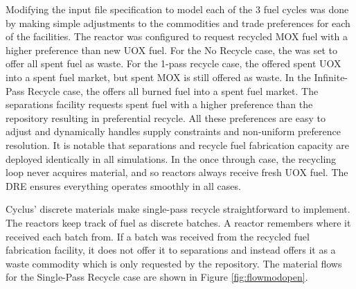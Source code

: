Modifying the input file specification to model each of the 3 fuel cycles was
done by making simple adjustments to the commodities and trade preferences for
each of the facilities.  The reactor was configured to request recycled \gls{MOX}
fuel with a higher preference than new \gls{UOX} fuel. For the No Recycle case,
the  was set to offer all spent fuel as waste.  For the 1-pass
recycle case, the  offered spent \gls{UOX} into a spent fuel market,
but spent \gls{MOX} is still offered as waste.  In the Infinite-Pass Recycle case,
the  offers all burned fuel into a spent fuel market. The
separations facility requests spent fuel with a higher preference than the
repository resulting in preferential recycle.  All these preferences are easy
to adjust and \Cyclus dynamically handles supply constraints and non-uniform
preference resolution.  It is notable that separations and recycle fuel
fabrication capacity are deployed identically in all simulations.  In the once
through case, the recycling loop never acquires material, and so reactors
always receive fresh \gls{UOX} fuel.  The \gls{DRE} ensures everything operates
smoothly in all cases.

Cyclus' discrete materials make single-pass recycle straightforward to implement.  The
reactors keep track of fuel as discrete batches. A reactor remembers where it
received each batch from.  If a batch was received from the recycled fuel
fabrication facility, it does not offer it to separations and instead offers
it as a waste commodity which is only requested by the repository.  The
material flows for the Single-Pass Recycle case are shown in Figure
\ref{fig:flowmodopen}.

